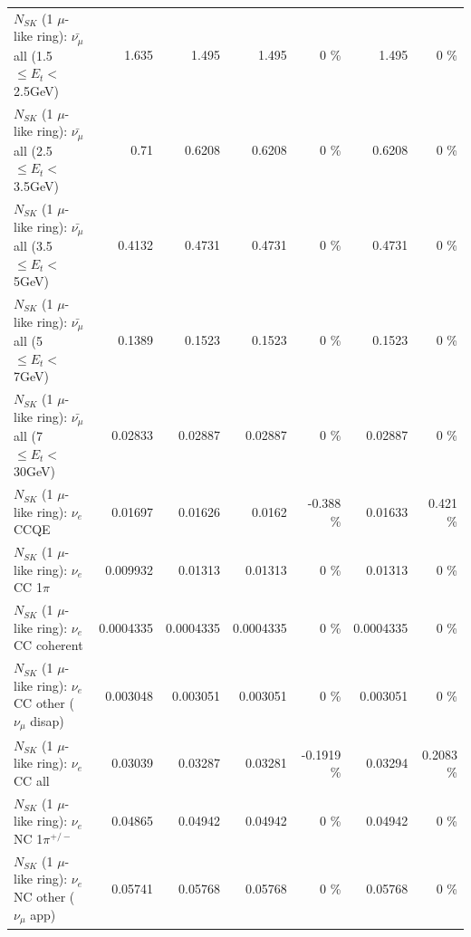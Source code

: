 \begin{table}
\begin{tabular}{| l | r | r | r  r | r  r |}
 $N_{SK}$ (1 $\mu$-like ring): $\bar{\nu_{\mu}}$ all (1.5 $\leq E_{t} <$ 2.5GeV) &           1.635 &           1.495 &           1.495 &        0 \%  &           1.495 &        0 \%  \\ 
 $N_{SK}$ (1 $\mu$-like ring): $\bar{\nu_{\mu}}$ all (2.5 $\leq E_{t} <$ 3.5GeV) &            0.71 &          0.6208 &          0.6208 &        0 \%  &          0.6208 &        0 \%  \\ 
   $N_{SK}$ (1 $\mu$-like ring): $\bar{\nu_{\mu}}$ all (3.5 $\leq E_{t} <$ 5GeV) &          0.4132 &          0.4731 &          0.4731 &        0 \%  &          0.4731 &        0 \%  \\ 
     $N_{SK}$ (1 $\mu$-like ring): $\bar{\nu_{\mu}}$ all (5 $\leq E_{t} <$ 7GeV) &          0.1389 &          0.1523 &          0.1523 &        0 \%  &          0.1523 &        0 \%  \\ 
    $N_{SK}$ (1 $\mu$-like ring): $\bar{\nu_{\mu}}$ all (7 $\leq E_{t} <$ 30GeV) &         0.02833 &         0.02887 &         0.02887 &        0 \%  &         0.02887 &        0 \%  \\ 
\hline
\hline
\hline
                                      $N_{SK}$ (1 $\mu$-like ring): $\nu_e$ CCQE &         0.01697 &         0.01626 &          0.0162 &   -0.388 \%  &         0.01633 &    0.421 \%  \\ 
                                 $N_{SK}$ (1 $\mu$-like ring): $\nu_e$ CC 1$\pi$ &        0.009932 &         0.01313 &         0.01313 &        0 \%  &         0.01313 &        0 \%  \\ 
                               $N_{SK}$ (1 $\mu$-like ring): $\nu_e$ CC coherent &       0.0004335 &       0.0004335 &       0.0004335 &        0 \%  &       0.0004335 &        0 \%  \\ 
                $N_{SK}$ (1 $\mu$-like ring): $\nu_e$ CC other ($\nu_\mu$ disap) &        0.003048 &        0.003051 &        0.003051 &        0 \%  &        0.003051 &        0 \%  \\ 
                                  $N_{SK}$ (1 $\mu$-like ring): $\nu_{e}$ CC all &         0.03039 &         0.03287 &         0.03281 &  -0.1919 \%  &         0.03294 &   0.2083 \%  \\ 
\hline
                           $N_{SK}$ (1 $\mu$-like ring): $\nu_e$ NC 1$\pi^{+/-}$ &         0.04865 &         0.04942 &         0.04942 &        0 \%  &         0.04942 &        0 \%  \\ 
                  $N_{SK}$ (1 $\mu$-like ring): $\nu_e$ NC other ($\nu_\mu$ app) &         0.05741 &         0.05768 &         0.05768 &        0 \%  &         0.05768 &        0 \%  \\ 

\end{tabular}
\end{table}
